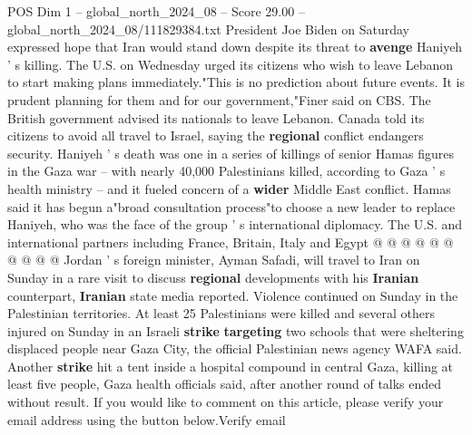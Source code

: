 \begin{textsample}{POS Dim 1 – global\_north\_2024\_08 – Score 29.00 – global\_north\_2024\_08/111829384.txt}
President Joe Biden on Saturday expressed hope that Iran would stand down despite its threat to \textbf{avenge} Haniyeh ' s killing.
The U.S. on Wednesday urged its citizens who wish to leave Lebanon to start making plans immediately."This is no prediction about future events.
It is prudent planning for them and for our government,"Finer said on CBS.
The British government advised its nationals to leave Lebanon.
Canada told its citizens to avoid all travel to Israel, saying the \textbf{regional} conflict endangers security.
Haniyeh ' s death was one in a series of killings of senior Hamas figures in the Gaza war -- with nearly 40,000 Palestinians killed, according to Gaza ' s health ministry -- and it fueled concern of a \textbf{wider} Middle East conflict.
Hamas said it has begun a"broad consultation process"to choose a new leader to replace Haniyeh, who was the face of the group ' s international diplomacy.
The U.S. and international partners including France, Britain, Italy and Egypt @ @ @ @ @ @ @ @ @ @ Jordan ' s foreign minister, Ayman Safadi, will travel to Iran on Sunday in a rare visit to discuss \textbf{regional} developments with his \textbf{Iranian} counterpart, \textbf{Iranian} state media reported.
Violence continued on Sunday in the Palestinian territories.
At least 25 Palestinians were killed and several others injured on Sunday in an Israeli \textbf{strike} \textbf{targeting} two schools that were sheltering displaced people near Gaza City, the official Palestinian news agency WAFA said.
Another \textbf{strike} hit a tent inside a hospital compound in central Gaza, killing at least five people, Gaza health officials said, after another round of talks ended without result.
If you would like to comment on this article, please verify your email address using the button below.Verify email

\end{textsample}
